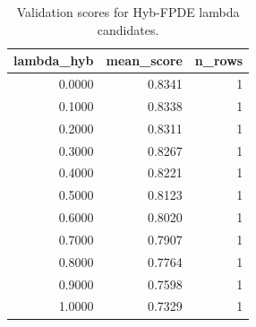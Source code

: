 \begin{table}[t]
\caption{Validation scores for Hyb-FPDE lambda candidates.}
\label{tab:lambda_distribution_computed}
\centering
\begin{tabular}{rrr}
\toprule
lambda\_hyb & mean\_score & n\_rows \\
\midrule
0.0000 & 0.8341 & 1 \\
0.1000 & 0.8338 & 1 \\
0.2000 & 0.8311 & 1 \\
0.3000 & 0.8267 & 1 \\
0.4000 & 0.8221 & 1 \\
0.5000 & 0.8123 & 1 \\
0.6000 & 0.8020 & 1 \\
0.7000 & 0.7907 & 1 \\
0.8000 & 0.7764 & 1 \\
0.9000 & 0.7598 & 1 \\
1.0000 & 0.7329 & 1 \\
\bottomrule
\end{tabular}

\end{table}
